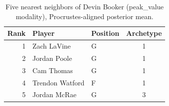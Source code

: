 \begin{table}[htbp]
  \centering\small
  \begin{tabular}{rllc}
    \toprule
    Rank & Player & Position & Archetype \\
    \midrule
    1 & Zach LaVine & G & 1 \\
    2 & Jordan Poole & G & 1 \\
    3 & Cam Thomas & G & 1 \\
    4 & Trendon Watford & F & 1 \\
    5 & Jordan McRae & G & 3 \\
    \bottomrule
  \end{tabular}
  \caption{Five nearest neighbors of Devin Booker (peak_value modality), Procrustes-aligned posterior mean.}
  \label{tab:Devin_Booker_neighbors_peak_value}
\end{table}

